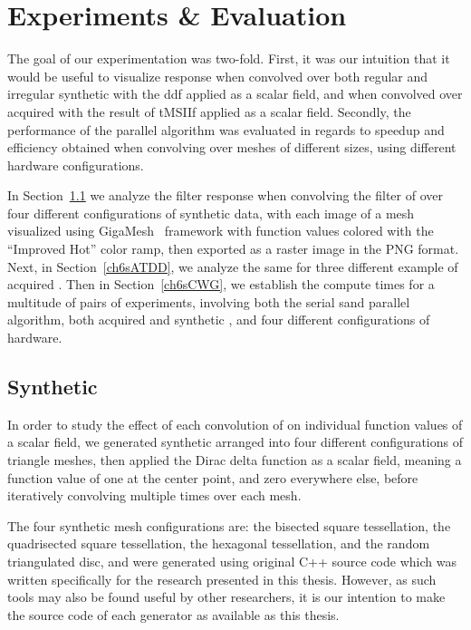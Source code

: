 \chapter{Experiments \& Evaluation}
\label{ch6}
The goal of our experimentation was two-fold. First, it was our intuition that it would be useful to visualize  response when convolved over both regular and irregular synthetic \tdd{} with the \gls{ddf} applied as a scalar field, and when convolved over acquired \tdd{} with the result of \gls{tMSIIf} applied as a scalar field. Secondly, the performance of the parallel algorithm was evaluated in regards to speedup and efficiency obtained when convolving  over meshes of different sizes, using different hardware configurations.

In Section~\ref{ch6sSTDD} we analyze the filter response when convolving the filter of over four different configurations of synthetic data, with each image of a mesh visualized using GigaMesh~\cite{Mara10} framework with function values colored with the ``Improved Hot'' color ramp, then exported as a raster image in the \gls{PNG} format. Next, in Section~\ref{ch6sATDD}, we analyze the same for three different example of acquired \tdd{}. Then in Section~\ref{ch6sCWG}, we establish the compute times for a multitude of pairs of experiments, involving both the serial sand parallel algorithm, both acquired and synthetic \tdd{}, and four different configurations of hardware.

%
%
%
%
%
%
\section{Synthetic \tdd{}}
\label{ch6sSTDD}
In order to study the effect of each convolution of  on individual function values of a scalar field, we generated synthetic \tdd{} arranged into four different configurations of triangle meshes, then applied the Dirac delta function as a scalar field, meaning a function value of one at the center point, and zero everywhere else, before iteratively convolving  multiple times over each mesh.

The four synthetic mesh configurations are: the bisected square tessellation, the quadrisected square tessellation, the hexagonal tessellation, and the random triangulated disc, and were generated using original C++ source code which was written specifically for the research presented in this thesis. However, as such tools may also be found useful by other researchers, it is our intention to make the source code of each generator as available as this thesis.

